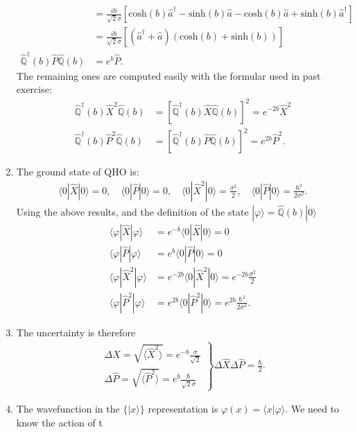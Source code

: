 \documentclass[letterpaper,11pt,twoside]{article}
\newcommand{\ket}[1]{|#1\rangle}
\newcommand{\braket}[1]{\langle#1\rangle}
\begin{document}
\begin{enumerate}[itemsep=0pt,topsep=0pt,label=\alph*)]
\begin{align*}
    &=\frac{i\hbar}{\sqrt{2}\sigma}\left[\text{cosh}(b)\hat{a}^\dagger-\text{sinh}(b)\hat{a}-\text{cosh}(b)\hat{a}+\text{sinh}(b)\hat{a}^\dagger\right]\\
    &=\frac{i\hbar}{\sqrt{2}\sigma}[(\hat{a}^\dagger+\hat{a})(\text{cosh}(b)+\text{sinh}(b))]\\
    \hat{\mathbb{Q}}^\dagger(b)\hat{P}\hat{\mathbb{Q}}(b)&=e^{b}\hat{P}.
  \end{align*}
  The remaining ones are computed easily with the formular used in past exercise:
  \begin{align*}
    \hat{\mathbb{Q}}^\dagger(b)\hat{X}^2\hat{\mathbb{Q}}(b)&=[\hat{\mathbb{Q}}^\dagger(b)\hat{X}\hat{\mathbb{Q}}(b)]^2=e^{-2b}\hat{X}^2\\
    \hat{\mathbb{Q}}^\dagger(b)\hat{P}^2\hat{\mathbb{Q}}(b)&=[\hat{\mathbb{Q}}^\dagger(b)\hat{P}\hat{\mathbb{Q}}(b)]^2=e^{2b}\hat{P}^2.
  \end{align*}
  \item The ground state of QHO is:
  \begin{align*}
    \braket{0|\hat{X}|0}=0,\quad\braket{0|\hat{P}|0}=0,\quad\braket{0|\hat{X}^2|0}=\frac{\sigma^2}{2},\quad\braket{0|\hat{P}|0}=\frac{\hbar^2}{2\sigma^2}.
  \end{align*}
  Using the above results, and the definition of the state $\ket{\varphi}=\hat{\mathbb{Q}}(b)\ket{0}$
  \begin{align*}
    \braket{\varphi|\hat{X}|\varphi}&=e^{-b}\braket{0|\hat{X}|0}=0\\
    \braket{\varphi|\hat{P}|\varphi}&=e^b\braket{0|\hat{P}|0}=0\\
    \braket{\varphi|\hat{X}^2|\varphi}&=e^{-2b}\braket{0|\hat{X}^2|0}=e^{-2b}\frac{\sigma^2}{2}\\
    \braket{\varphi|\hat{P}^2|\varphi}&=e^{2b}\braket{0|\hat{P}^2|0}=e^{2b}\frac{\hbar^2}{2\sigma^2}.
  \end{align*}
  \item The uncertainty is therefore 
  \begin{align*}
    \left.\begin{array}{l}
      \Delta\hat{X}=\sqrt{\braket{\hat{X}^2}}=e^{-b}\frac{\sigma}{\sqrt{2}}\\
      \Delta\hat{P}=\sqrt{\braket{\hat{P}^2}}=e^b\frac{\hbar}{\sqrt{2}\sigma}
    \end{array}\right\}\Delta\hat{X}\Delta\hat{P}=\frac{\hbar}{2}.
  \end{align*}
  \item The wavefunction in the $\{\ket{x}\}$ representation is $\varphi(x)=\braket{x|\varphi}$. We need to know the action of t

\end{enumerate}
\end{document}

